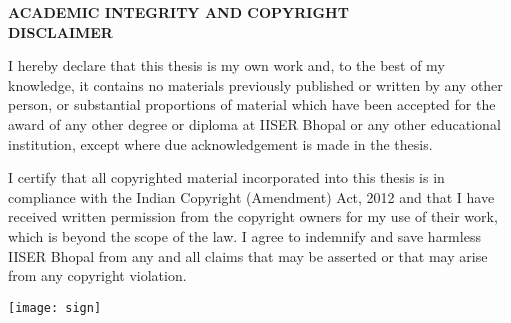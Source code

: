

\begin{center}
	\Large{\textbf{ACADEMIC INTEGRITY AND COPYRIGHT \\
			\vspace{0.5cm}
			DISCLAIMER}}
\end{center}
{\selectfont
	I hereby declare that this thesis is my own work and, to the best of
	my knowledge, it contains no materials previously published or written
	by any other person, or substantial proportions of material which have
	been accepted for the award of any other degree or diploma at IISER
	Bhopal or any other educational institution, except where due
	acknowledgement is made in the thesis.
	
	
	\noindent I certify that all copyrighted material incorporated into this thesis is in compliance with the Indian Copyright (Amendment) Act, 2012 and that I have received written permission from the copyright owners for my use of their work, which is beyond the scope of the law. I agree to indemnify and save harmless IISER Bhopal from any and all claims that may be asserted or that may arise from any copyright violation.
	
	\vspace{4cm}
	\parbox{0.7\textwidth}{ 
	}
	\hfill 
	\parbox{0.3\textwidth}{ 
		\texttt{[image: sign]}
		\mbox{\studentname}
	}
}